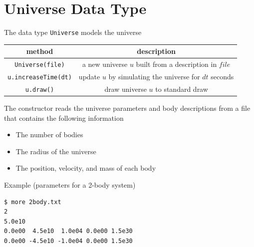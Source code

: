 \documentclass[8pt,a4paper,compress]{beamer}
\begin{document}
\section{Universe Data Type}
\begin{frame}[fragile]
\pause

The data type \lstinline{Universe} models the universe
\begin{center}
\begin{tabular}{cc}
method & description \\ \hline
\lstinline$Universe(file)$ & a new universe $u$ built from a description in $file$ \\
\lstinline$u.increaseTime(dt)$ & update $u$ by simulating the universe for $dt$ seconds \\
\lstinline$u.draw()$ & draw universe $u$ to standard draw
\end{tabular} 
\end{center}

\pause
\bigskip

The constructor reads the universe parameters and body descriptions from a file that contains the following information
\begin{itemize}
\item The number of bodies
\item The radius of the universe
\item The position, velocity, and mass of each body
\end{itemize}

\pause
\bigskip

Example (parameters for a 2-body system)
\begin{lstlisting}[language={}]
$ more 2body.txt
2 
5.0e10 
0.0e00  4.5e10  1.0e04 0.0e00 1.5e30 
0.0e00 -4.5e10 -1.0e04 0.0e00 1.5e30 
\end{lstlisting}
\end{frame}
\end{document}
